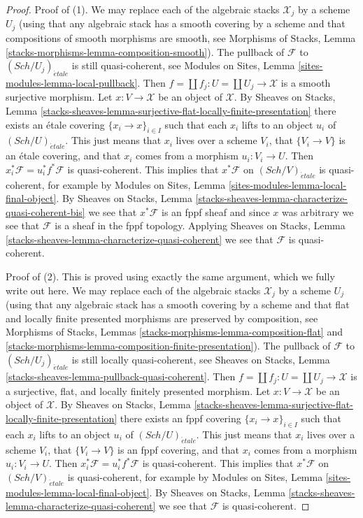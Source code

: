 \documentclass[10pt,a4paper]{amsart}
\theoremstyle{plain}
\theoremstyle{definition}
\theoremstyle{remark}
\numberwithin{equation}{subsection}
\def\Sch{\mathit{Sch}}
\def\etale{{\acute{e}tale}}
\begin{document}
\begin{proof}
Proof of (1). We may replace each of the algebraic stacks $\mathcal{X}_j$
by a scheme $U_j$ (using that any algebraic stack has a smooth covering by
a scheme and that compositions of smooth morphisms are smooth, see
Morphisms of Stacks, Lemma \ref{stacks-morphisms-lemma-composition-smooth}).
The pullback of $\mathcal{F}$ to $(\Sch/U_j)_\etale$ is still
quasi-coherent, see
Modules on Sites, Lemma \ref{sites-modules-lemma-local-pullback}.
Then $f = \coprod f_j : U = \coprod U_j \to \mathcal{X}$ is a smooth surjective
morphism. Let $x : V \to \mathcal{X}$ be an object of $\mathcal{X}$. By
Sheaves on Stacks, Lemma
\ref{stacks-sheaves-lemma-surjective-flat-locally-finite-presentation}
there exists an \'etale covering $\{x_i \to x\}_{i \in I}$
such that each $x_i$ lifts to an object $u_i$ of $(\Sch/U)_\etale$.
This just means that $x_i$ lives over a scheme $V_i$, that
$\{V_i \to V\}$ is an \'etale covering, and that $x_i$ comes from
a morphism $u_i : V_i \to U$. Then
$x_i^*\mathcal{F} = u_i^*f^*\mathcal{F}$ is quasi-coherent.
This implies that $x^*\mathcal{F}$ on $(\Sch/V)_\etale$
is quasi-coherent, for example by
Modules on Sites, Lemma \ref{sites-modules-lemma-local-final-object}.
By Sheaves on Stacks, Lemma
\ref{stacks-sheaves-lemma-characterize-quasi-coherent-bis}
we see that $x^*\mathcal{F}$ is an fppf sheaf and since $x$
was arbitrary we see that $\mathcal{F}$ is a sheaf in the
fppf topology. Applying Sheaves on Stacks, Lemma
\ref{stacks-sheaves-lemma-characterize-quasi-coherent}
we see that $\mathcal{F}$ is quasi-coherent.

\medskip\noindent
Proof of (2). This is proved using exactly the same argument, which we fully
write out here. We may replace each of the algebraic stacks $\mathcal{X}_j$
by a scheme $U_j$ (using that any algebraic stack has a smooth covering by
a scheme and that flat and locally finite presented morphisms are preserved
by composition, see Morphisms of Stacks, Lemmas
\ref{stacks-morphisms-lemma-composition-flat} and
\ref{stacks-morphisms-lemma-composition-finite-presentation}).
The pullback of $\mathcal{F}$ to $(\Sch/U_j)_\etale$ is still
locally quasi-coherent, see
Sheaves on Stacks, Lemma \ref{stacks-sheaves-lemma-pullback-quasi-coherent}.
Then $f = \coprod f_j : U = \coprod U_j \to \mathcal{X}$ is a surjective,
flat, and locally finitely presented morphism. Let
$x : V \to \mathcal{X}$ be an object of $\mathcal{X}$. By
Sheaves on Stacks, Lemma
\ref{stacks-sheaves-lemma-surjective-flat-locally-finite-presentation}
there exists an fppf covering $\{x_i \to x\}_{i \in I}$
such that each $x_i$ lifts to an object $u_i$ of $(\Sch/U)_\etale$.
This just means that $x_i$ lives over a scheme $V_i$, that
$\{V_i \to V\}$ is an fppf covering, and that $x_i$ comes from
a morphism $u_i : V_i \to U$. Then
$x_i^*\mathcal{F} = u_i^*f^*\mathcal{F}$ is quasi-coherent.
This implies that $x^*\mathcal{F}$ on $(\Sch/V)_\etale$
is quasi-coherent, for example by
Modules on Sites, Lemma \ref{sites-modules-lemma-local-final-object}.
By Sheaves on Stacks, Lemma
\ref{stacks-sheaves-lemma-characterize-quasi-coherent}
we see that $\mathcal{F}$ is quasi-coherent.
\end{proof}
\end{document}
